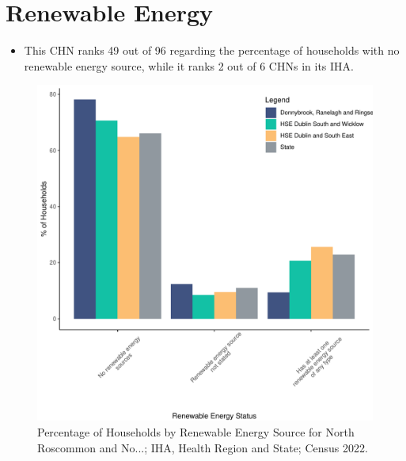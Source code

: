 \documentclass{article}
\begin{document}
\section{Renewable Energy}\label{sect:RE}
\begin{itemize}
\item This CHN ranks  49 out of 96 regarding the percentage of households with no renewable energy source, while it ranks   2 out of 6 CHNs in its IHA.
\end{itemize}
\begin{figure}[H]
	\centering
	\includegraphics[width = 140mm]{../figures/RenewableEnergyED.pdf}
	\caption{Percentage of Households by Renewable Energy Source for North Roscommon and No...; IHA, Health Region and State; Census 2022.}
	\label{fig:vbnv}
	\end{figure}
\end{document}
